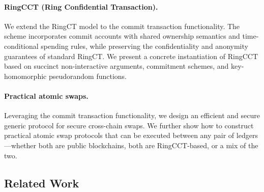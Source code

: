 \paragraph*{RingCCT (Ring Confidential Transaction).} We extend the RingCT model to the commit transaction functionality. The scheme incorporates commit accounts with shared ownership semantics and time-conditional spending rules, while preserving the confidentiality and anonymity guarantees of standard RingCT. We present a concrete instantiation of RingCCT based on succinct non-interactive arguments, commitment schemes, and key-homomorphic pseudorandom functions.
\paragraph*{Practical atomic swaps.} 
Leveraging the commit transaction functionality, we design an efficient and secure generic protocol for secure cross-chain swaps. We further show how to construct practical atomic swap protocols that can be executed between any pair of ledgers—whether both are public blockchains, both are RingCCT-based, or a mix of the two.


\subsection{Related Work}
